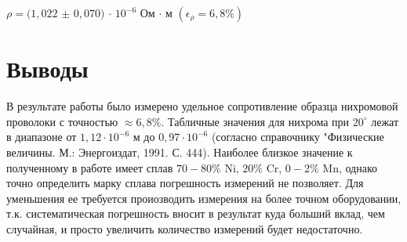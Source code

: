 \documentclass[a4paper]{article}
\begin{document}
$\rho = (1,022$ $\pm$ $0,070)$ $\cdot$ $10^{-6}$ Ом $\cdot$ м $(\epsilon_\rho = 6,8 \%)$

\section{Выводы}
В результате работы было измерено удельное сопротивление образца нихромовой проволоки с точностью $\approx 6,8 \%$. Табличные значения для нихрома при $20^{\circ}$ лежат в диапазоне от $1,12 \cdot 10^{-6}$ м до $0,97 \cdot 10^{-6}$ (согласно справочнику "Физические величины. М.: Энергоиздат, 1991. С. 444). Наиболее близкое значение к полученному в работе имеет сплав $70-80\%$ Ni, $ 20\%$ Cr, $0-2\%$ Mn, однако точно определить марку сплава погрешность измерений не позволяет. Для уменьшения ее требуется проиозводить измерения на более точном оборудовании, т.к. систематическая погрешность вносит в результат куда больший вклад, чем случайная, и просто увеличить количество измерений будет недостаточно.
\end{document}
